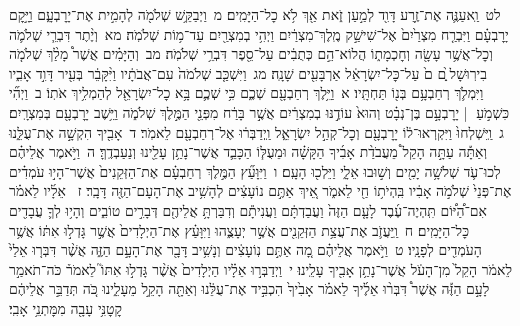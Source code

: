\documentclass[18pt]{article}
\newcommand{\kri}[1]{\Afootnote{#1}}	%
\begin{document}
 {\loc לט~}וַֽאעַנֶּ֛ה אֶת־זֶ֥רַע דָּוִ֖ד לְמַ֣עַן זֹ֑את אַ֖ךְ לֹ֥א כׇל־הַיָּמִֽים׃ \startlock
 {\loc מ~}וַיְבַקֵּ֥שׁ שְׁלֹמֹ֖ה לְהָמִ֣ית אֶת־יָרׇבְעָ֑ם וַיָּ֣קׇם יָרׇבְעָ֗ם וַיִּבְרַ֤ח מִצְרַ֙יִם֙ אֶל־שִׁישַׁ֣ק מֶֽלֶךְ־מִצְרַ֔יִם וַיְהִ֥י בְמִצְרַ֖יִם עַד־מ֥וֹת שְׁלֹמֹֽה׃ \startlock
 {\loc מא~}וְיֶ֨תֶר דִּבְרֵ֧י שְׁלֹמֹ֛ה וְכׇל־אֲשֶׁ֥ר עָשָׂ֖ה וְחׇכְמָת֑וֹ הֲלוֹא־הֵ֣ם כְּתֻבִ֔ים עַל־סֵ֖פֶר דִּבְרֵ֥י שְׁלֹמֹֽה׃ \startlock
 {\loc מב~}וְהַיָּמִ֗ים אֲשֶׁר֩ מָלַ֨ךְ שְׁלֹמֹ֤ה בִירֽוּשָׁל ַ֙͏ְם ם֙ עַל־כׇּל־יִשְׂרָאֵ֔ל אַרְבָּעִ֖ים שָׁנָֽה׃ \startlock
 {\loc מג~}וַיִּשְׁכַּ֤ב שְׁלֹמֹה֙ עִם־אֲבֹתָ֔יו וַיִּ֨קָּבֵ֔ר בְּעִ֖יר דָּוִ֣ד אָבִ֑יו וַיִּמְלֹ֛ךְ רְחַבְעָ֥ם בְּנ֖וֹ תַּחְתָּֽיו׃ 
\startlock
 {\loc א~}וַיֵּ֥לֶךְ רְחַבְעָ֖ם שְׁכֶ֑ם כִּ֥י שְׁכֶ֛ם בָּ֥א כׇל־יִשְׂרָאֵ֖ל לְהַמְלִ֥יךְ אֹתֽוֹ׃ \startlock
 {\loc ב~}וַיְהִ֞י כִּשְׁמֹ֣עַ  |  יָרׇבְעָ֣ם בֶּן־נְבָ֗ט וְהוּא֙ עוֹדֶ֣נּוּ בְמִצְרַ֔יִם אֲשֶׁ֣ר בָּרַ֔ח מִפְּנֵ֖י הַמֶּ֣לֶךְ שְׁלֹמֹ֑ה וַיֵּ֥שֶׁב יָרׇבְעָ֖ם בְּמִצְרָֽיִם׃ \startlock
 {\loc ג~}וַֽיִּשְׁלְחוּ֙ וַיִּקְרְאוּ־ל֔וֹ  \edtext{(ויבאו)}{\kri{קרי: וַיָּבֹ֥א}}  יָרׇבְעָ֖ם וְכׇל־קְהַ֣ל יִשְׂרָאֵ֑ל וַֽיְדַבְּר֔וּ אֶל־רְחַבְעָ֖ם לֵאמֹֽר׃ \startlock
 {\loc ד~}אָבִ֖יךָ הִקְשָׁ֣ה אֶת־עֻלֵּ֑נוּ וְאַתָּ֡ה עַתָּ֣ה הָקֵל֩ מֵעֲבֹדַ֨ת אָבִ֜יךָ הַקָּשָׁ֗ה וּמֵעֻלּ֧וֹ הַכָּבֵ֛ד אֲשֶׁר־נָתַ֥ן עָלֵ֖ינוּ וְנַעַבְדֶֽךָּ׃ \startlock
 {\loc ה~}וַיֹּ֣אמֶר אֲלֵיהֶ֗ם לְכוּ־עֹ֛ד שְׁלֹשָׁ֥ה יָמִ֖ים וְשׁ֣וּבוּ אֵלָ֑י וַיֵּלְכ֖וּ הָעָֽם׃ \startlock
 {\loc ו~}וַיִּוָּעַ֞ץ הַמֶּ֣לֶךְ רְחַבְעָ֗ם אֶת־הַזְּקֵנִים֙ אֲשֶׁר־הָי֣וּ עֹמְדִ֗ים אֶת־פְּנֵי֙ שְׁלֹמֹ֣ה אָבִ֔יו בִּֽהְיֹת֥וֹ חַ֖י לֵאמֹ֑ר אֵ֚יךְ אַתֶּ֣ם נוֹעָצִ֔ים לְהָשִׁ֥יב אֶת־הָעָם־הַזֶּ֖ה דָּבָֽר׃ \startlock
 {\loc ז~}\edtext{(וידבר)}{\kri{קרי: וַיְדַבְּר֨וּ}}  אֵלָ֜יו לֵאמֹ֗ר אִם־הַ֠יּ֠וֹם תִּֽהְיֶה־עֶ֜בֶד לָעָ֤ם הַזֶּה֙ וַעֲבַדְתָּ֔ם וַעֲנִיתָ֕ם וְדִבַּרְתָּ֥ אֲלֵיהֶ֖ם דְּבָרִ֣ים טוֹבִ֑ים וְהָי֥וּ לְךָ֛ עֲבָדִ֖ים כׇּל־הַיָּמִֽים׃ \startlock
 {\loc ח~}וַֽיַּעֲזֹ֛ב אֶת־עֲצַ֥ת הַזְּקֵנִ֖ים אֲשֶׁ֣ר יְעָצֻ֑הוּ וַיִּוָּעַ֗ץ אֶת־הַיְלָדִים֙ אֲשֶׁ֣ר גָּדְל֣וּ אִתּ֔וֹ אֲשֶׁ֥ר הָעֹמְדִ֖ים לְפָנָֽיו׃ \startlock
 {\loc ט~}וַיֹּ֣אמֶר אֲלֵיהֶ֗ם מָ֚ה אַתֶּ֣ם נֽוֹעָצִ֔ים וְנָשִׁ֥יב דָּבָ֖ר אֶת־הָעָ֣ם הַזֶּ֑ה אֲשֶׁ֨ר דִּבְּר֤וּ אֵלַי֙ לֵאמֹ֔ר הָקֵל֙ מִן־הָעֹ֔ל אֲשֶׁר־נָתַ֥ן אָבִ֖יךָ עָלֵֽינוּ׃ \startlock
 {\loc י~}וַיְדַבְּר֣וּ אֵלָ֗יו הַיְלָדִים֙ אֲשֶׁ֨ר גָּדְל֣וּ אִתּוֹ֮ לֵאמֹר֒ כֹּה־תֹאמַ֣ר לָעָ֣ם הַזֶּ֡ה אֲשֶׁר֩ דִּבְּר֨וּ אֵלֶ֜יךָ לֵאמֹ֗ר אָבִ֙יךָ֙ הִכְבִּ֣יד אֶת־עֻלֵּ֔נוּ וְאַתָּ֖ה הָקֵ֣ל מֵעָלֵ֑ינוּ כֹּ֚ה תְּדַבֵּ֣ר אֲלֵיהֶ֔ם  קׇטׇנִּ֥י  עָבָ֖ה מִמׇּתְנֵ֥י אָבִֽי׃ \startlock
\end{document}
